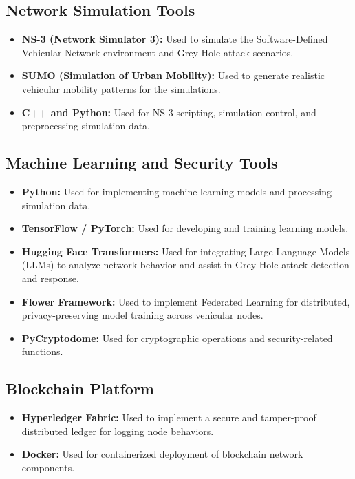 \documentclass[12pt, a4paper]{report}
\begin{document}
\subsection{Network Simulation Tools}
\begin{itemize}
    \item \textbf{NS-3 (Network Simulator 3):}
    Used to simulate the Software-Defined Vehicular Network environment and Grey Hole attack scenarios.
    \item \textbf{SUMO (Simulation of Urban Mobility):}
    Used to generate realistic vehicular mobility patterns for the simulations.
    \item \textbf{C++ and Python:}
    Used for NS-3 scripting, simulation control, and preprocessing simulation data.
\end{itemize}

\subsection{Machine Learning and Security Tools}
\begin{itemize}
    \item \textbf{Python:}
    Used for implementing machine learning models and processing simulation data.
    \item \textbf{TensorFlow / PyTorch:}
    Used for developing and training learning models.
    \item \textbf{Hugging Face Transformers:}
    Used for integrating Large Language Models (LLMs) to analyze network behavior and assist in Grey Hole attack detection and response.
    \item \textbf{Flower Framework:}
    Used to implement Federated Learning for distributed, privacy-preserving model training across vehicular nodes.
    \item \textbf{PyCryptodome:}
    Used for cryptographic operations and security-related functions.
\end{itemize}

\subsection{Blockchain Platform}
\begin{itemize}
    \item \textbf{Hyperledger Fabric:}
    Used to implement a secure and tamper-proof distributed ledger for logging node behaviors.
    \item \textbf{Docker:}
    Used for containerized deployment of blockchain network components.
\end{itemize}
\end{document}
